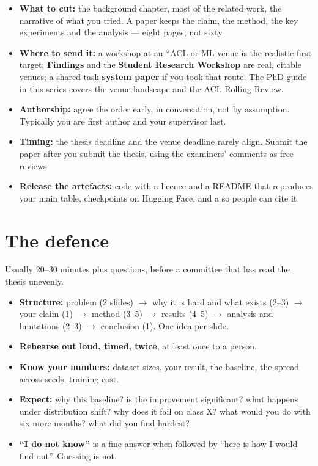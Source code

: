 \documentclass[11pt,a4paper]{article}
\begin{document}
\begin{itemize}
  \item \textbf{What to cut:} the background chapter, most of the related
        work, the narrative of what you tried. A paper keeps the claim, the
        method, the key experiments and the analysis --- eight pages, not
        sixty.
  \item \textbf{Where to send it:} a workshop at an \mbox{*ACL} or ML venue is
        the realistic first target; \textbf{Findings} and the \textbf{Student
        Research Workshop} are real, citable venues; a shared-task
        \textbf{system paper} if you took that route. The PhD guide in this
        series covers the venue landscape and the ACL Rolling Review.
  \item \textbf{Authorship:} agree the order early, in conversation, not by
        assumption. Typically you are first author and your supervisor last.
  \item \textbf{Timing:} the thesis deadline and the venue deadline rarely
        align. Submit the paper after you submit the thesis, using the
        examiners' comments as free reviews.
  \item \textbf{Release the artefacts:} code with a licence and a README that
        reproduces your main table, checkpoints on Hugging Face, and a
         so people can cite it.
\end{itemize}

\section{The defence}

Usually 20--30 minutes plus questions, before a committee that has read the
thesis unevenly.

\begin{itemize}
  \item \textbf{Structure:} problem (2 slides) $\rightarrow$ why it is hard
        and what exists (2--3) $\rightarrow$ your claim (1) $\rightarrow$
        method (3--5) $\rightarrow$ results (4--5) $\rightarrow$ analysis and
        limitations (2--3) $\rightarrow$ conclusion (1). One idea per slide.
  \item \textbf{Rehearse out loud, timed, twice}, at least once to a person.
  \item \textbf{Know your numbers:} dataset sizes, your result, the baseline,
        the spread across seeds, training cost.
  \item \textbf{Expect:} why this baseline? is the improvement significant?
        what happens under distribution shift? why does it fail on class X?
        what would you do with six more months? what did you find hardest?
  \item \textbf{``I do not know''} is a fine answer when followed by ``here is
        how I would find out''. Guessing is not.
\end{itemize}
\end{document}
